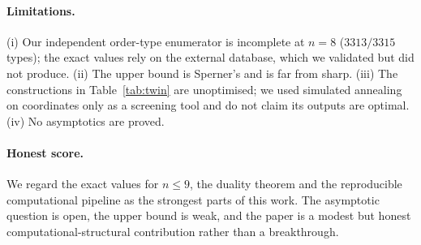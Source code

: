 \documentclass[11pt,a4paper]{article}
\theoremstyle{definition}
\begin{document}
\paragraph{Limitations.} (i) Our independent order-type enumerator is incomplete
at $n=8$ ($3313/3315$ types); the exact values rely on the external database,
which we validated but did not produce.  (ii) The upper bound is Sperner's and is
far from sharp.  (iii) The constructions in Table~\ref{tab:twin} are unoptimised;
we used simulated annealing on coordinates only as a screening tool and do not
claim its outputs are optimal.  (iv) No asymptotics are proved.

\paragraph{Honest score.} We regard the exact values for $n\le 9$, the duality
theorem and the reproducible computational pipeline as the strongest parts of this
work.  The asymptotic question is open, the upper bound is weak, and the paper is
a modest but honest computational-structural contribution rather than a
breakthrough.
\end{document}
